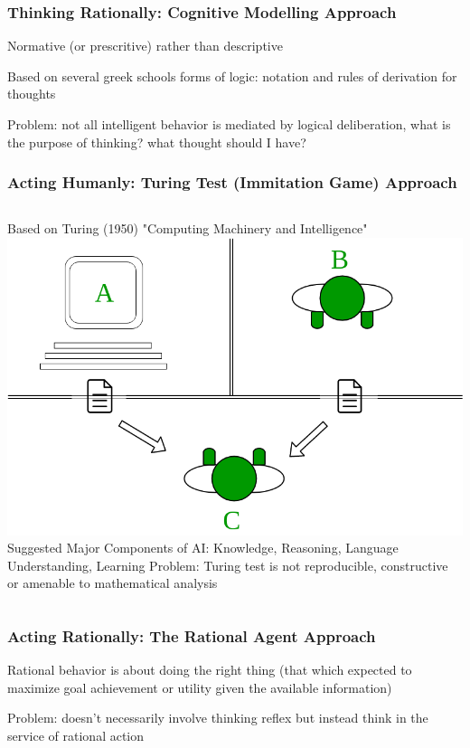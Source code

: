\documentclass{beamer}
\begin{document}
\begin{frame}
  \frametitle{Thinking Rationally: Cognitive Modelling Approach}
   Normative (or prescritive) rather than descriptive

Based on several greek schools forms of logic: notation and rules of derivation for thoughts

Problem: not all intelligent behavior is mediated by logical deliberation, what is the purpose of thinking? what thought should I have?

\end{frame}

\begin{frame}
  \frametitle{Acting Humanly: Turing Test (Immitation Game) Approach}
  \begin{columns}
      Based on Turing (1950) "Computing Machinery and Intelligence"
      \includegraphics[width=\textwidth]{Turing-Test.png}
      Suggested Major Components of AI: Knowledge, Reasoning, Language Understanding, Learning
      \vspace{10pt}
      Problem: Turing test is not reproducible, constructive or amenable to mathematical analysis
  \end{columns}

\end{frame}

\begin{frame}
  \frametitle{Acting Rationally: The Rational Agent Approach}
  Rational behavior is about doing the right thing (that which expected to maximize goal achievement or utility given the available information)
  
  Problem: doesn't necessarily involve thinking reflex but instead think in the service of rational action

\end{frame}
\end{document}
